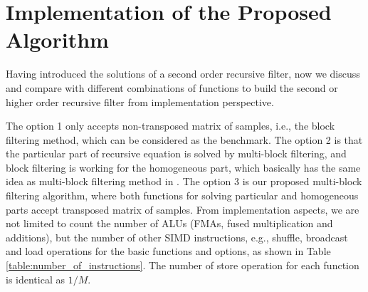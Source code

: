 \section{Implementation of the Proposed Algorithm}
\label{sec:implementation}

Having introduced the solutions of a second order recursive filter, now we discuss and compare with different
combinations of functions to build the second or higher order recursive filter from implementation perspective.

The option 1 only accepts non-transposed matrix of samples, i.e., the block filtering method, which can be considered as the benchmark.
The option 2 is that the particular part of recursive equation is solved by multi-block filtering, 
and block filtering is working for the homogeneous part, which basically has the same idea as multi-block filtering method in \cite{Jaewoo_09}.
The option 3 is our proposed multi-block filtering algorithm, where both functions for solving particular and homogeneous parts accept transposed matrix of samples.
From implementation aspects, we are not limited to count the number of ALUs (FMAs, fused multiplication and additions), but the number of other SIMD instructions, 
e.g., shuffle, broadcast and load operations for the basic functions and options, as shown in Table \ref{table:number_of_instructions}.
The number of store operation for each function is identical as $1/M$. 

